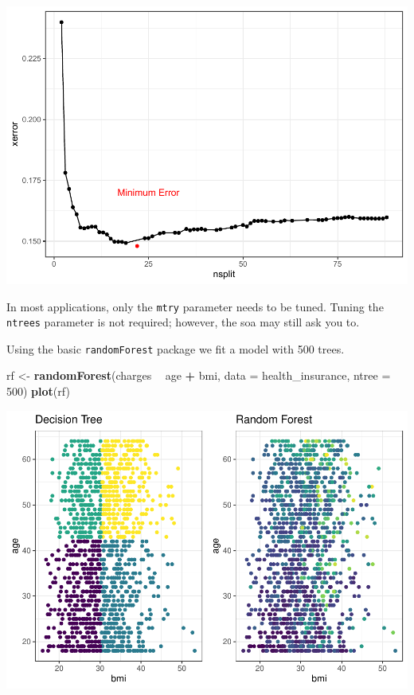 \documentclass[]{book}
\newenvironment{Shaded}{\begin{snugshade}}{\end{snugshade}}
\newcommand{\DataTypeTok}[1]{\textcolor[rgb]{0.13,0.29,0.53}{#1}}
\newcommand{\DecValTok}[1]{\textcolor[rgb]{0.00,0.00,0.81}{#1}}
\newcommand{\KeywordTok}[1]{\textcolor[rgb]{0.13,0.29,0.53}{\textbf{#1}}}
\newcommand{\NormalTok}[1]{#1}
\newcommand{\OperatorTok}[1]{\textcolor[rgb]{0.81,0.36,0.00}{\textbf{#1}}}
\newcommand{\StringTok}[1]{\textcolor[rgb]{0.31,0.60,0.02}{#1}}
\begin{document}
\includegraphics{Exam-PA-Study-Manual_files/figure-latex/unnamed-chunk-122-1.pdf}

In most applications, only the \texttt{mtry} parameter needs to be tuned. Tuning the \texttt{ntrees} parameter is not required; however, the soa may still ask you to.

Using the basic \texttt{randomForest} package we fit a model with 500 trees.

\begin{Shaded}
\begin{Highlighting}[]
\NormalTok{rf <-}\StringTok{ }\KeywordTok{randomForest}\NormalTok{(charges }\OperatorTok{~}\StringTok{ }\NormalTok{age }\OperatorTok{+}\StringTok{ }\NormalTok{bmi, }\DataTypeTok{data =}\NormalTok{ health_insurance, }\DataTypeTok{ntree =} \DecValTok{500}\NormalTok{)}
\KeywordTok{plot}\NormalTok{(rf)}
\end{Highlighting}
\end{Shaded}

\includegraphics{Exam-PA-Study-Manual_files/figure-latex/unnamed-chunk-123-1.pdf}
\end{document}
